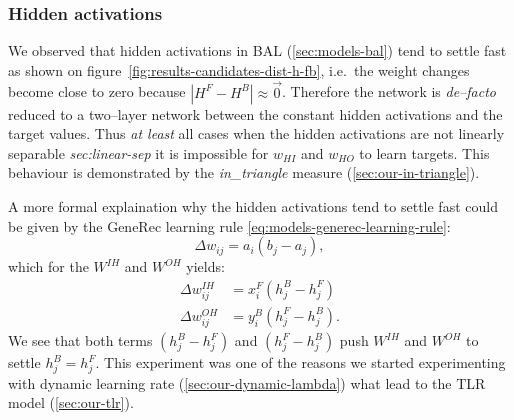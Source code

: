 
\subsubsection{Hidden activations}
\label{sec:our-hidden-activation} 

We observed that hidden activations in BAL (\ref{sec:models-bal}) tend to settle fast as shown on figure~\ref{fig:results-candidates-dist-h-fb}, i.e.~the weight changes become close to zero because $|H^F - H^B| \approx \overrightarrow{0}$. Therefore the network is \emph{de--facto} reduced to a two--layer network between the constant hidden activations and the target values. Thus \emph{at least} all cases when the hidden activations are not linearly separable \emph{sec:linear-sep} it is impossible for $w_{HI}$ and $w_{HO}$ to learn targets. This behaviour is demonstrated by the \emph{in\_triangle} measure (\ref{sec:our-in-triangle}). 

A more formal explaination why the hidden activations tend to settle fast could be given by the GeneRec learning rule \ref{eq:models-generec-learning-rule}: 
\begin{equation} 
  \Delta w_{ij} = a_i(b_j - a_j),
\end{equation} \nonumber 
which for the $W^{IH}$ and $W^{OH}$ yields: 
\begin{align} 
  \Delta w_{ij}^{IH} &= x^F_i(h^B_j - h^F_j) \nonumber \\ 
  \Delta w_{ij}^{OH} &= y^B_i(h^F_j - h^B_j). \nonumber  
\end{align} 
We see that both terms $(h^B_j - h^F_j)$ and $(h^F_j - h^B_j)$ push $W^{IH}$ and $W^{OH}$ to settle $h^B_j = h^F_j$. This experiment was one of the reasons we started experimenting with dynamic learning rate (\ref{sec:our-dynamic-lambda}) what lead to the TLR model (\ref{sec:our-tlr}). 

